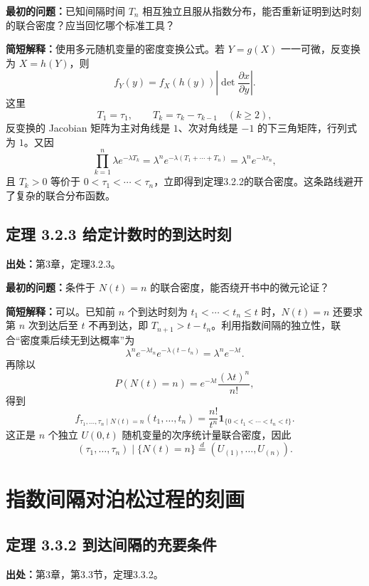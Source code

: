 \documentclass[11pt,a4paper]{ctexart}
\begin{document}
\textbf{最初的问题：}已知间隔时间 $T_n$ 相互独立且服从指数分布，能否重新证明到达时刻的联合密度？应当回忆哪个标准工具？

\textbf{简短解释：}使用多元随机变量的密度变换公式。若 $Y=g(X)$ 一一可微，反变换为 $X=h(Y)$，则
\[
 f_Y(y)=f_X(h(y))\left|\det\frac{\partial x}{\partial y}\right|.
\]
这里
\[
 T_1=\tau_1,\qquad T_k=\tau_k-\tau_{k-1}\quad(k\ge2),
\]
反变换的 Jacobian 矩阵为主对角线是 $1$、次对角线是 $-1$ 的下三角矩阵，行列式为 $1$。又因
\[
 \prod_{k=1}^n\lambda e^{-\lambda T_k}
 =\lambda^n e^{-\lambda(T_1+\cdots+T_n)}
 =\lambda^n e^{-\lambda\tau_n},
\]
且 $T_k>0$ 等价于 $0<\tau_1<\cdots<\tau_n$，立即得到定理3.2.2的联合密度。这条路线避开了复杂的联合分布函数。

\subsection{定理 3.2.3 给定计数时的到达时刻}
\label{note:sp-poisson-conditional-order-stat}
\textbf{出处：}第3章，定理3.2.3。

\textbf{最初的问题：}条件于 $N(t)=n$ 的联合密度，能否绕开书中的微元论证？

\textbf{简短解释：}可以。已知前 $n$ 个到达时刻为 $t_1<\cdots<t_n\le t$ 时，$N(t)=n$ 还要求第 $n$ 次到达后至 $t$ 不再到达，即 $T_{n+1}>t-t_n$。利用指数间隔的独立性，联合“密度乘后续无到达概率”为
\[
 \lambda^n e^{-\lambda t_n}e^{-\lambda(t-t_n)}=\lambda^n e^{-\lambda t}.
\]
再除以
\[
 P(N(t)=n)=e^{-\lambda t}\frac{(\lambda t)^n}{n!},
\]
得到
\[
 f_{\tau_1,\ldots,\tau_n\mid N(t)=n}(t_1,\ldots,t_n)
 =\frac{n!}{t^n}\mathbf 1_{\{0<t_1<\cdots<t_n<t\}}.
\]
这正是 $n$ 个独立 $U(0,t)$ 随机变量的次序统计量联合密度，因此
\[
 (\tau_1,\ldots,\tau_n)\mid\{N(t)=n\}
 \overset d=(U_{(1)},\ldots,U_{(n)}).
\]

\section{指数间隔对泊松过程的刻画}

\subsection{定理 3.3.2 到达间隔的充要条件}
\label{note:sp-poisson-iid-exp-characterization}
\textbf{出处：}第3章，第3.3节，定理3.3.2。
\end{document}
